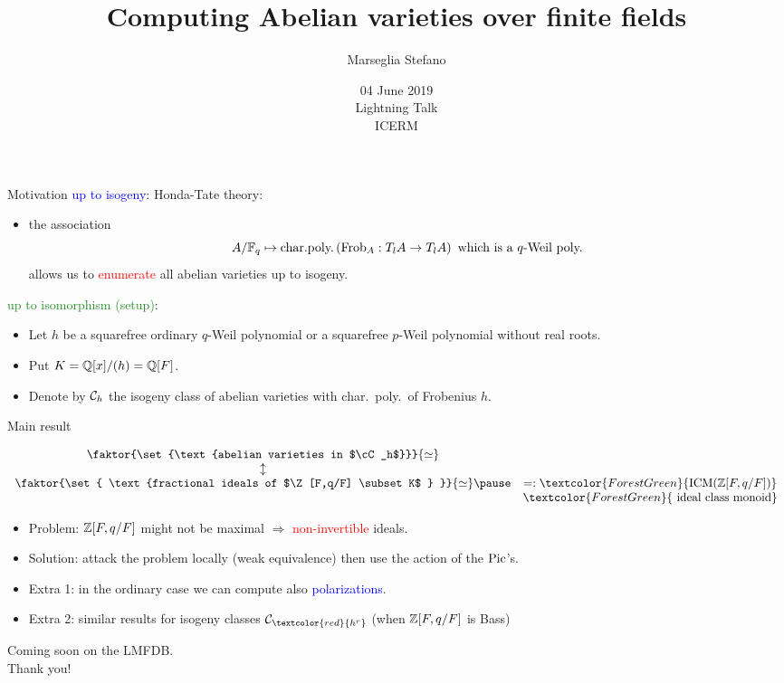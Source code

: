 \documentclass[usenames,dvipsnames]{beamer}
\title[]{Computing Abelian varieties over finite fields}
\author[Marseglia Stefano]{Marseglia Stefano}
\institute[]{Utrecht University}
\date[04 June 2019]{04 June 2019\\
	   Lightning Talk\\ ICERM}
\newcommand{\red}[1]{\textcolor{red}{#1}}
\newcommand{\blue}[1]{\textcolor{blue}{#1}}
\newcommand{\green}[1]{\textcolor{ForestGreen}{#1}}
\begin{document}
\begin{frame}
\titlepage
\end{frame}

\begin{frame}{ Motivation }
\blue{up to isogeny}: Honda-Tate theory:
\begin{itemize}
\pause \item the association
\[ A/\mathbb{F}_q \mapsto \text{char.poly.}\left( \operatorname{Frob}_A:T_lA\to T_lA \right) \text{ which is a $q$-Weil poly.} \]
allows us to \red{enumerate} all abelian varieties up to isogeny.
\end{itemize}

\green{up to isomorphism (setup)}: 
\begin{itemize}
 \pause \item Let $h$ be a squarefree ordinary $q$-Weil polynomial or a squarefree $p$-Weil polynomial without real roots.
 \pause \item Put $K=\mathbb{Q}[x]/(h)=\mathbb{Q}[F]$.
 \pause \item Denote by ${\mathcal C}_h$ the isogeny class of abelian varieties with char.~poly.~of Frobenius $h$.
 \end{itemize}
\end{frame}

\begin{frame}{ Main result }

\begin{theorem}[M.]
\[\begin{array}{cc}
\faktor{\set{\text{abelian varieties in $\cC_h$}}}{\simeq} & \\
\updownarrow & \\
\faktor{\set{ \text{fractional ideals of $\Z[F,q/F] \subset K$ } }}{\simeq} 
  \pause  
  & =:\green{\ICM(\Z[F,q/F])}\\ 
  & \green{\text{ ideal class monoid} }
  \end{array}\]
\end{theorem}
\begin{itemize}
 \pause \item Problem: $\mathbb{Z}[F,q/F]$ might not be maximal $\Rightarrow$ \red{non-invertible} ideals.
 \pause \item Solution: attack the problem locally (weak equivalence) then use the action of the $\operatorname{Pic}$'s.
 \pause \item Extra 1: in the ordinary case we can compute also \blue{polarizations}.
 \pause \item Extra 2: similar results for isogeny classes $\cC_{\red{h^r}}$ (when $\mathbb{Z}[F,q/F]$ is Bass)
 \end{itemize}
\end{frame}

\begin{frame}
\begin{center}
Coming soon on the LMFDB.\\
\vspace{5em}
Thank you!
\end{center}
\end{frame}
\end{document}
